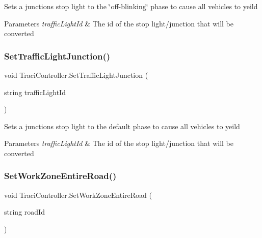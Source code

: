 Sets a junction\textquotesingle{}s stop light to the \char`\"{}off-\/blinking\char`\"{} phase to cause all vehicles to yeild 


\begin{DoxyParams}{Parameters}
{\em traffic\+Light\+Id} & The id of the stop light/junction that will be converted\\
\hline
\end{DoxyParams}
\mbox{\label{class_traci_controller_a058ad2eec9a474491fd1549c5b269e25}} 
\subsubsection{\texorpdfstring{SetTrafficLightJunction()}{SetTrafficLightJunction()}}
{\footnotesize\ttfamily void Traci\+Controller.\+Set\+Traffic\+Light\+Junction (\begin{DoxyParamCaption}\item[{string}]{traffic\+Light\+Id }\end{DoxyParamCaption})}



Sets a junction\textquotesingle{}s stop light to the default phase to cause all vehicles to yeild 


\begin{DoxyParams}{Parameters}
{\em traffic\+Light\+Id} & The id of the stop light/junction that will be converted\\
\hline
\end{DoxyParams}
\mbox{\label{class_traci_controller_ae16a322e3cb2b298a8f52ceaa6661171}} 
\subsubsection{\texorpdfstring{SetWorkZoneEntireRoad()}{SetWorkZoneEntireRoad()}}
{\footnotesize\ttfamily void Traci\+Controller.\+Set\+Work\+Zone\+Entire\+Road (\begin{DoxyParamCaption}\item[{string}]{road\+Id }\end{DoxyParamCaption})}



